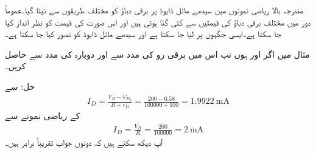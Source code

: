
مندرجہ بالا ریاضی نمونوں میں سیدھے مائل ڈایوڈ پر برقی دباؤ  کو مختلف طریقوں سے نپٹا گیا۔عموماً دور میں مختلف برقی دباؤ کی قیمتیں  سے کئی گنا ہوتی ہیں اور اس صورت  کی قیمت کو نظر انداز کیا جا سکتا ہے۔ایسی جگہوں پر  لیا جا سکتا ہے اور سیدھے مائل ڈایوڈ کو   تصور کیا جا سکتا ہے۔

مثال   میں اگر  اور  ہوں تب اس میں برقی رو  کی مدد سے اور دوبارہ  کی مدد سے حاصل کریں۔

حل:  سے
\begin{align*}
I_D=\frac{V_B-V_{D_0}}{R+r_D}=\frac{200-0.58}{100000+100}=\SI{1.9922}{\milli \ampere}
\end{align*}
 کے ریاضی نمونے سے
\begin{align*}
I_D=\frac{V_B}{R}=\frac{200}{100000}=\SI{2}{\milli \ampere}
\end{align*}
آپ دیکھ سکتے ہیں کہ دونوں جواب تقریباً برابر ہیں۔


